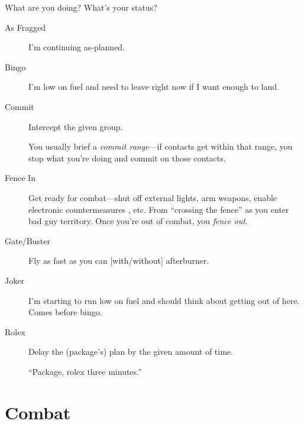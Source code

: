 What are you doing? What's your status?
\begin{description}

\item[As Fragged] I'm continuing as-planned.

\item[Bingo] I'm low on fuel and need to leave right now if I want enough
    to land.

\item[Commit] Intercept the given group.

    You usually brief a \emph{commit range}---if contacts get within that range,
    you stop what you're doing and commit on those contacts.

\item[Fence In] Get ready for combat---shut off external lights,
    arm weapons, enable electronic countermeasures , etc.
    From ``crossing the fence'' as you enter bad guy territory.
    Once you're out of combat, you \emph{fence out}.

\item[Gate/Buster] Fly as fast as you can [with/without] afterburner.

\item[Joker] I'm starting to run low on fuel and should think about getting
    out of here. Comes before bingo.

\item[Rolex] Delay the (package's) plan by the given amount of time.

    ``Package, rolex three minutes.''
\end{description}

\section{Combat}

